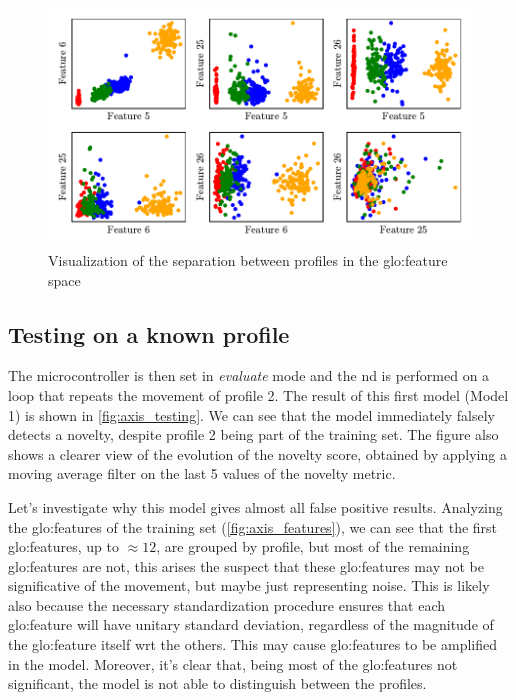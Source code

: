 \begin{figure}
    \centering
    \includegraphics{images/LinearMotor/Scatter.pdf}
    \caption{Visualization of the separation between profiles in the \gls{glo:feature} space}
    \label{fig:axis_scatter}
\end{figure}


\subsection{Testing on a known profile}
The microcontroller is then set in \emph{evaluate} mode and the \gls{nd} is performed on a loop that repeats the movement of profile 2. The result of this first model (Model 1) is shown in \autoref{fig:axis_testing}. We can see that the model immediately falsely detects a novelty, despite profile 2 being part of the training set. The figure also shows a clearer view of the evolution of the novelty score, obtained by applying a moving average filter on the last 5 values of the novelty metric.

Let's investigate why this model gives almost all false positive results. Analyzing the \gls{glo:feature}s of the training set (\autoref{fig:axis_features}), we can see that the first \gls{glo:feature}s, up to $\approx 12$, are grouped by profile, but most of the remaining \gls{glo:feature}s are not, this arises the suspect that these \gls{glo:feature}s may not be significative of the movement, but maybe just representing noise. This is likely also because the necessary standardization procedure ensures that each \gls{glo:feature} will have unitary standard deviation, regardless of the magnitude of the \gls{glo:feature} itself \gls{wrt} the others. This may cause  \gls{glo:feature}s to be amplified in the model. Moreover, it's clear that, being most of the \gls{glo:feature}s not significant, the model is not able to distinguish between the profiles.

